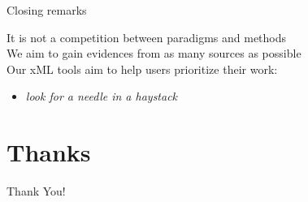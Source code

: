 \documentclass[compress,ignorenonframetext,aspectratio=1610,handout]{beamer}
\begin{document}
\begin{frame}{Closing remarks}
	
	It is not a competition between paradigms and methods \\

	We aim to gain evidences from as many sources as possible \\

	Our xML tools aim to help users prioritize their work:
	\begin{itemize}
		\item  \textit{look for a needle in a haystack}
	\end{itemize}

\end{frame}



\section{Thanks}

	\begin{frame}{}
		\begin{center}
			{\fontsize{40}{50}\selectfont Thank You!}
		\end{center}
	\end{frame}
\end{document}
